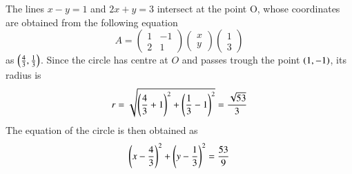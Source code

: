 The lines $x-y=1$ and $2x+y=3$ intersect at the point O, whose coordinates are obtained from the following equation
\begin{equation}
A =
\begin{pmatrix}
1 & -1
\\
 2 & 1
\end{pmatrix}
\begin{pmatrix}
x
\\
y
\end{pmatrix}
\begin{pmatrix}
1 
\\
 3
\end{pmatrix}
\end{equation}
as $\left(\frac{4}{3},\frac{1}{3}\right)$.  Since the circle has centre at $O$ and passes trough the point $\left(1,-1\right)$, its radius is
%
\begin{equation}
r = \sqrt{\left(\frac{4}{3}+1\right)^2+\left(\frac{1}{3}-1\right)^2} = \frac{\sqrt{53}}{3}
\end{equation}
%
The equation of the circle is then obtained as
%
\begin{equation}
\left(x-\frac{4}{3}\right)^2+\left(y-\frac{1}{3}\right)^2=\frac{53}{9}
\end{equation}
% 
%    
